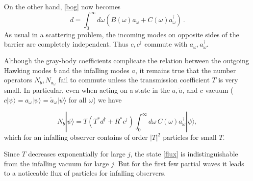 \documentclass[12pt]{article}
\begin{document}
On the other hand,  \eqref{bog} now becomes
\begin{equation}
\label{bog2}
d =  \int_0^\infty d\omega \left(B(\omega) a_\omega +  C(\omega)  a^\dagger_\omega
\right)\, .
\end{equation}
As usual in a scattering problem, the incoming modes on opposite sides of the barrier are completely independent.  Thus $c, c^\dagger$ commute with $a_\omega, a_\omega^\dagger$.

Although the gray-body coefficients complicate the relation between the outgoing Hawking modes $b$ and the infalling modes $a$, it remains true that the number operators $N_b,N_{a_\omega}$ fail to commute unless the transmission coefficient $T$ is very small.  In particular, even when acting on a state in the $a,\tilde a$, and $c$ vacuum ($c |\psi \rangle = a_\omega |\psi \rangle = \tilde a_\omega |\psi \rangle$ for all $\omega$) we have

\begin{equation}
\label{flux}
N_b |\psi \rangle = T(T^*d^\dagger + R^* c^\dagger) \int_0^\infty d\omega \, C(\omega)  a^\dagger_\omega |\psi \rangle,
\end{equation}
which for an infalling observer contains of order $|T|^2$ particles for small $T$.

Since $T$ decreases exponentially for large $j$, the state \eqref{flux} is indistinguishable from the infalling vacuum for large $j$.  But for the first few partial waves it leads to a noticeable flux of particles for infalling observers.
\end{document}
